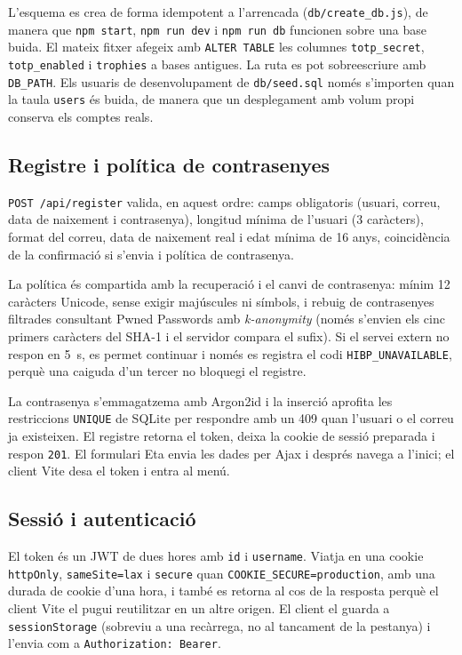 \documentclass[11pt,a4paper]{article}
\begin{document}
L'esquema es crea de forma idempotent a l'arrencada (\texttt{db/create\_db.js}), de
manera que \texttt{npm start}, \texttt{npm run dev} i \texttt{npm run db} funcionen
sobre una base buida. El mateix fitxer afegeix amb \texttt{ALTER TABLE} les columnes
\texttt{totp\_secret}, \texttt{totp\_enabled} i \texttt{trophies} a bases antigues. La
ruta es pot sobreescriure amb \texttt{DB\_PATH}. Els usuaris de desenvolupament de
\texttt{db/seed.sql} només s'importen quan la taula \texttt{users} és buida, de manera
que un desplegament amb volum propi conserva els comptes reals.

\subsection{Registre i política de contrasenyes}

\texttt{POST /api/register} valida, en aquest ordre: camps obligatoris (usuari, correu,
data de naixement i contrasenya), longitud mínima de l'usuari (3 caràcters), format del
correu, data de naixement real i edat mínima de 16 anys, coincidència de la confirmació
si s'envia i política de contrasenya.

La política és compartida amb la recuperació i el canvi de contrasenya: mínim 12
caràcters Unicode, sense exigir majúscules ni símbols, i rebuig de contrasenyes
filtrades consultant Pwned Passwords amb \emph{k-anonymity} (només s'envien els cinc
primers caràcters del SHA-1 i el servidor compara el sufix). Si el servei extern no
respon en 5~s, es permet continuar i només es registra el codi
\texttt{HIBP\_UNAVAILABLE}, perquè una caiguda d'un tercer no bloquegi el registre.

La contrasenya s'emmagatzema amb Argon2id i la inserció aprofita les restriccions
\texttt{UNIQUE} de SQLite per respondre amb un 409 quan l'usuari o el correu ja
existeixen. El registre retorna el token, deixa la cookie de sessió preparada i respon
\texttt{201}. El formulari Eta envia les dades per Ajax i després navega a l'inici; el
client Vite desa el token i entra al menú.

\subsection{Sessió i autenticació}

El token és un JWT de dues hores amb \texttt{id} i \texttt{username}. Viatja en una
cookie \texttt{httpOnly}, \texttt{sameSite=lax} i \texttt{secure} quan
\texttt{COOKIE\_SECURE=production}, amb una durada de cookie d'una hora, i també es
retorna al cos de la resposta perquè el client Vite el pugui reutilitzar en un altre
origen. El client el guarda a \texttt{sessionStorage} (sobreviu a una recàrrega, no al
tancament de la pestanya) i l'envia com a \texttt{Authorization: Bearer}.
\end{document}
